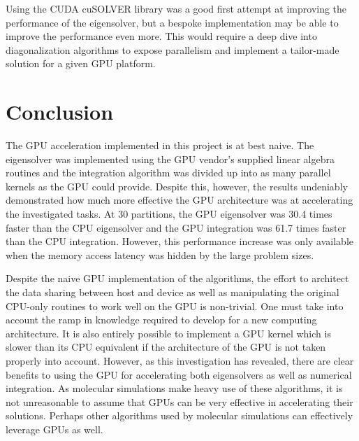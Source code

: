 \documentclass[conference, twoside]{IEEEtran}
\begin{document}
Using the CUDA cuSOLVER library was a good first attempt at improving the performance of the eigensolver, but a bespoke implementation may be able to improve the performance even more. This would require a deep dive into diagonalization algorithms to expose parallelism and implement a tailor-made solution for a given GPU platform.

\section{Conclusion} %

The GPU acceleration implemented in this project is at best naive. The eigensolver was implemented using the GPU vendor's supplied linear algebra routines and the integration algorithm was divided up into as many parallel kernels as the GPU could provide. Despite this, however, the results undeniably demonstrated how much more effective the GPU architecture was at accelerating the investigated tasks. At 30 partitions, the GPU eigensolver was 30.4 times faster than the CPU eigensolver and the GPU integration was 61.7 times faster than the CPU integration. However, this performance increase was only available when the memory access latency was hidden by the large problem sizes.

Despite the naive GPU implementation of the algorithms, the effort to architect the data sharing between host and device as well as manipulating the original CPU-only routines to work well on the GPU is non-trivial. One must take into account the ramp in knowledge required to develop for a new computing architecture. It is also entirely possible to implement a GPU kernel which is slower than its CPU equivalent if the architecture of the GPU is not taken properly into account. However, as this investigation has revealed, there are clear benefits to using the GPU for accelerating both eigensolvers as well as numerical integration. As molecular simulations make heavy use of these algorithms, it is not unreasonable to assume that GPUs can be very effective in accelerating their solutions. Perhaps other algorithms used by molecular simulations can effectively leverage GPUs as well.



\end{document}
